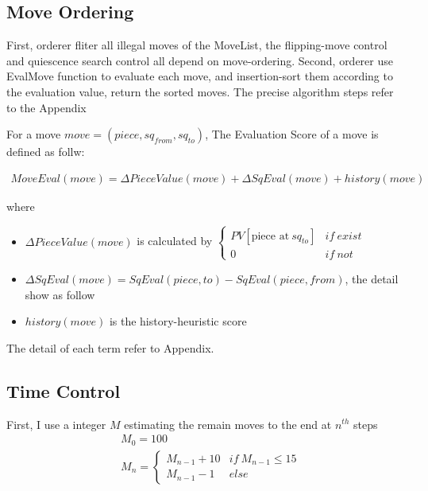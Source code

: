 \documentclass[a4paper, 12pt]{article}  %
\begin{document}

\subsection{Move Ordering}
First, orderer fliter all illegal moves of the MoveList, the flipping-move control and quiescence search control all depend on move-ordering.
Second, orderer use EvalMove function to evaluate each move, and insertion-sort them according to the evaluation value, return the sorted moves. The precise algorithm steps refer to the Appendix

For a move $move=(piece, sq_{from}, sq_{to})$, The Evaluation Score of a move is defined as follw:

\begin{align*}
  MoveEval(move) = \Delta PieceValue(move) + \Delta SqEval(move) + history(move)
\end{align*}

where

\begin{itemize}
  \item $\Delta PieceValue(move)$ is calculated by $\begin{cases}
    PV[\text{piece at}\ sq_{to}]&if\ exist\\
    0&if\ not
  \end{cases}$
  \item $\Delta SqEval(move) = SqEval(piece, to) - SqEval(piece, from)$, the detail show as follow
  \item $history(move)$ is the history-heuristic score
\end{itemize}

The detail of each term refer to Appendix.

\subsection{Time Control}

First, I use a integer $M$ estimating the remain moves to the end at $n^{th}$ steps
\begin{align*}
&M_0 = 100\\ 
&M_n = \begin{cases}
M_{n-1} + 10&if\ M_{n-1} \le 15\\
M_{n-1}-1&else
\end{cases}
\end{align*}
\end{document}
